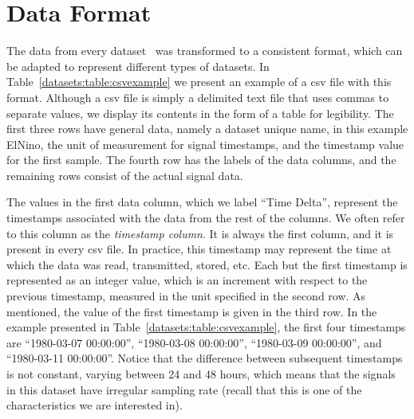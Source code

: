 
\clearpage
\section{Data Format}
\label{datasets:over}


The data from every dataset \dataCite\ was transformed to a consistent format, which can be adapted to represent different types of datasets. In Table~\ref{datasets:table:csvexample} we present an example of a csv file with this format. Although a csv file is simply a delimited text file that uses commas to separate values, we display its contents in the form of a table for legibility. The first three rows have general data, namely a dataset unique name, in this example ElNino, the unit of measurement for signal timestamps, and the timestamp value for the first sample. The fourth row has the labels of the data columns, and the remaining rows consist of the actual signal data.





\vspace{-5pt}
The values in the first data column, which we label ``Time Delta'', represent the timestamps associated with the data from the rest of the columns. We often refer to this column as the \textit{timestamp column}. It is always the first column, and it is present in every csv file. In practice, this timestamp may represent the time at which the data was read, transmitted, stored, etc. Each but the first timestamp is represented as an integer value, which is an increment with respect to the previous timestamp, measured in the unit specified in the second row. As mentioned, the value of the first timestamp is given in the third row. In the example presented in Table~\ref{datasets:table:csvexample}, the first four timestamps are ``1980-03-07 00:00:00'', ``1980-03-08 00:00:00'', ``1980-03-09 00:00:00'', and ``1980-03-11 00:00:00''. Notice that the difference between subsequent timestamps is not constant, varying between 24 and 48 hours, which means that the signals in this dataset have irregular sampling rate (recall that this is one of the characteristics we are interested in).


